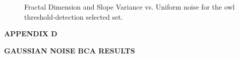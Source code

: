 \documentclass[12pt, oneside]{book}
\begin{document}
\begin{figure}[!b]
  \centering
  \caption[Fractal Dimension and Slope Variance vs. Uniform noise for the owl threshold-detection selected set]{Fractal Dimension and Slope Variance vs. Uniform noise for the owl threshold-detection selected set.}
  \label{fig:owl-thresh_multi_uniform_result}
\end{figure}

\clearpage

%
% 
\begin{center}
\textbf{APPENDIX D}

\textbf{GAUSSIAN NOISE BCA RESULTS}
\end{center}
\end{document}
